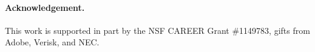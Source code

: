\documentclass[10pt,twocolumn,letterpaper]{article}
\begin{document}
\vspace{-2mm}
\paragraph{Acknowledgement.}
This work is supported in part by the NSF CAREER Grant \#1149783, gifts from Adobe, Verisk, and NEC.
\clearpage

{\small


}
\end{document}
